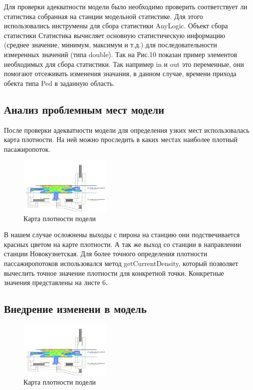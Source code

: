 \documentclass[12pt]{article}
\begin{document}
Для проверки адекватности модели было необходимо проверить соответствует ли статистика собранная на станции модельной статистике. Для этого использовались инструмены для сбора статистики AnyLogic. Объект сбора статистики Статистика вычисляет основную статистическую информацию (среднее значение, минимум, максимум и т.д.) для последовательности измеренных значений (типа double). Так на Рис.10 показан пример элементов необходимых для сбора статистики. Так например in и out это переменные, они помогают отсеживать изменения значания, в данном случае, времени прихода обекта типа Ped в заданную область.
\subsection{Анализ проблемным мест модели}

		
		
После проверки адекватности модели для определения узких мест использовалась карта плотности. На ней можно проследить в каких местах наиболее плотный пасажиропоток.

 \begin{figure}
  	\begin{center}
  	  	\includegraphics[width=0.4\textwidth]{den_map.jpg}
 	 \end{center}
	  	\caption{Карта плотности подели}
\end{figure}	

   В нашем случае осложнены выходы с пирона на станцию они подствечивается красных цветом на карте плотности. А так же выход со станции в направлении станции Новокузнетская. Для более точного определения плотности пассажиропотоков использовался метод getCurrentDensity, который позволяет вычеслить точное значение плотности для конкретной точки. Конкретные значения представлены на листе 6. 		
		\subsection{Внедрение изменени в модель}

\begin{figure}
  	\begin{center}
  	  	\includegraphics[width=0.4\textwidth]{den_map_new.jpg}
 	 \end{center}
	  	\caption{Карта плотности подели}
\end{figure}		
\end{document}
